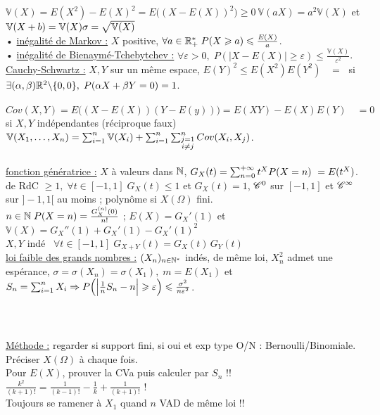 \documentclass[12 pt]{exampleclass}
\begin{document}
$\mathbb{V}(X)=E(X^2)-E(X)^2 = E\big((X-E(X))^2\big)\geqslant 0 \ \mathbb{V}(aX) = a^2 \mathbb{V}(X)$ et $\mathbb{V}(X+b)=\mathbb{V}(X) \\ \sigma = \sqrt{\mathbb{V}(X)}$\\
• \underline{inégalité de Markov :} $X$ positive, $\forall a\in\mathbb{R}_+^* \; P(X\geqslant a)\leqslant \frac{E(X)}{a}$.\\
• \underline{inégalité de Bienaymé-Tchebytchev :} $\forall \varepsilon>0, \; P(|X-E(X)|\geqslant \varepsilon) \leqslant \frac{\mathbb{V}(X)}{\varepsilon^2}$.\newpage
\text{}\\
\underline{Cauchy-Schwartz :} $X,Y$ sur un même espace, $E(Y)^2\leqslant E(X^2)E(Y^2)$ \ $=\;$ si $\exists (\alpha,\beta)\mathbb{R}^2\backslash\{0,0\}, \; P(\alpha X+\beta Y =0) = 1$.\\
\text{}\\
$Cov(X,Y) = E\big((X-E(X))(Y-E(y))\big) = E(XY) - E(X)E(Y) \quad =0$ si $X,Y$ indépendantes (réciproque faux)\\
$\mathbb{V}(X_1,\dots,X_n) = \sum_{i=1}^n \mathbb{V}(X_i) + \sum_{i=1}^n \sum_{\substack{j=1\\i\neq j}}^n Cov(X_i,X_j)$.\\
\text{}\\
\underline{fonction génératrice :} $X$ à valeurs dans $\mathbb{N}$, $G_X(t) = \sum_{n=0}^{+\infty} t^X P(X=n) \ =E(t^X)$.\\
de RdC $\geqslant 1, \; \forall t\in [-1,1] \; G_X(t)\leqslant 1$ et $G_X(t) =1$, $\mathscr{C}^0$ sur $[-1,1]$ et $\mathscr{C}^\infty$ sur $]-1,1[$ au moins ; polynôme si $X(\Omega)$ fini.\\
$n\in \mathbb{N} \; P(X=n) = \frac{G_X^{(n)}(0)}{n!}$ ; $E(X) = G_X'(1)$ et $\mathbb{V}(X) = G_X''(1) + G_X'(1)-G_X'(1)^2$\\
$X,Y$ indé \ $\forall t\in [-1,1]\; G_{X+Y}(t) = G_X(t)\, G_Y(t)$\\
\underline{loi faible des grands nombres :} $(X_n)_{n\in\mathbb{N}^*}$ indés, de même loi, $X_n^2$ admet une espérance, $\sigma=\sigma(X_n)=\sigma(X_1),\; m=E(X_1)$ et $S_n = \sum_{i=1}^n X_i \Rightarrow P\Big(\Big| \frac{1}{n}S_n -n\Big| \geqslant\varepsilon\Big) \leqslant \frac{\sigma^2}{n\varepsilon^2}$.\\
\text{}\\
\text{}\\
\text{}\\
\underline{Méthode :} regarder si support fini, si oui et exp type O/N : Bernoulli/Binomiale.\\
Préciser $X(\Omega)$ à chaque fois.\\
Pour $E(X)$, prouver la CVa puis calculer par $S_n$ !!\\
$\frac{k^2}{(k+1)!} = \frac{1}{(k-1)!} - \frac{1}{k} +\frac{1}{(k+1)!}$ \quad !\\
Toujours se ramener à $X_1$ quand $n$ VAD de même loi !!\\
\end{document}
